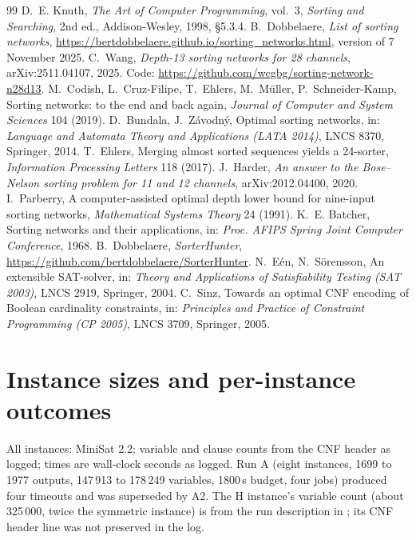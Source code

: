 \documentclass[11pt,a4paper]{article}
\theoremstyle{plain}
\theoremstyle{definition}
\theoremstyle{remark}
\begin{document}
\begin{thebibliography}{99}\small
{} D.~E. Knuth, \emph{The Art of Computer Programming}, vol.~3, \emph{Sorting and Searching}, 2nd ed., Addison-Wesley, 1998, \S5.3.4.
 B.~Dobbelaere, \emph{List of sorting networks}, \url{https://bertdobbelaere.github.io/sorting_networks.html}, version of 7 November 2025.
 C.~Wang, \emph{Depth-13 sorting networks for 28 channels}, arXiv:2511.04107, 2025. Code: \url{https://github.com/wcgbg/sorting-network-n28d13}.
 M.~Codish, L.~Cruz-Filipe, T.~Ehlers, M.~M\"uller, P.~Schneider-Kamp, Sorting networks: to the end and back again, \emph{Journal of Computer and System Sciences} 104 (2019).
 D.~Bundala, J.~Z\'avodn\'y, Optimal sorting networks, in: \emph{Language and Automata Theory and Applications (LATA 2014)}, LNCS 8370, Springer, 2014.
 T.~Ehlers, Merging almost sorted sequences yields a 24-sorter, \emph{Information Processing Letters} 118 (2017).
 J.~Harder, \emph{An answer to the Bose--Nelson sorting problem for 11 and 12 channels}, arXiv:2012.04400, 2020.
 I.~Parberry, A computer-assisted optimal depth lower bound for nine-input sorting networks, \emph{Mathematical Systems Theory} 24 (1991).
 K.~E. Batcher, Sorting networks and their applications, in: \emph{Proc. AFIPS Spring Joint Computer Conference}, 1968.
 B.~Dobbelaere, \emph{SorterHunter}, \url{https://github.com/bertdobbelaere/SorterHunter}.
 N.~E\'en, N.~S\"orensson, An extensible SAT-solver, in: \emph{Theory and Applications of Satisfiability Testing (SAT 2003)}, LNCS 2919, Springer, 2004.
 C.~Sinz, Towards an optimal CNF encoding of Boolean cardinality constraints, in: \emph{Principles and Practice of Constraint Programming (CP 2005)}, LNCS 3709, Springer, 2005.
\end{thebibliography}

\appendix

\section{Instance sizes and per-instance outcomes}\label{app:instances}

All instances: MiniSat 2.2; variable and clause counts from the CNF header as logged; times are wall-clock seconds as logged. Run A (eight instances, 1699 to 1977 outputs, 147\,913 to 178\,249 variables, 1800\,s budget, four jobs) produced four timeouts and was superseded by A2. The H instance's variable count (about 325\,000, twice the symmetric instance) is from the run description in ; its CNF header line was not preserved in the log.
\end{document}
